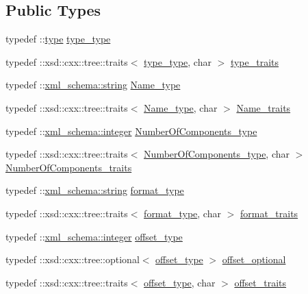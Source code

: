 \subsection*{Public Types}
\begin{DoxyCompactItemize}
\item 
typedef \+::\hyperlink{classtype}{type} \hyperlink{classDataArray__t_a484a0509e4f141d9970d75881703a51e}{type\+\_\+type}
\item 
typedef \+::xsd\+::cxx\+::tree\+::traits$<$ \hyperlink{classDataArray__t_a484a0509e4f141d9970d75881703a51e}{type\+\_\+type}, char $>$ \hyperlink{classDataArray__t_af1dc5f097a8645ae42b57eb3a0b10fa2}{type\+\_\+traits}
\item 
typedef \+::\hyperlink{namespacexml__schema_ac0cec83a330f0024e4e318b3deac5104}{xml\+\_\+schema\+::string} \hyperlink{classDataArray__t_afc6836923916c2489f91caea78ec4ad6}{Name\+\_\+type}
\item 
typedef \+::xsd\+::cxx\+::tree\+::traits$<$ \hyperlink{classDataArray__t_afc6836923916c2489f91caea78ec4ad6}{Name\+\_\+type}, char $>$ \hyperlink{classDataArray__t_a46d0b4cf44ee9122e4cbb3bd3abe6663}{Name\+\_\+traits}
\item 
typedef \+::\hyperlink{namespacexml__schema_aaaea7c8ce4dfbe26cc52c91c29c97b7c}{xml\+\_\+schema\+::integer} \hyperlink{classDataArray__t_aac602cec132f6e771f7fa3be1d19c16f}{Number\+Of\+Components\+\_\+type}
\item 
typedef \+::xsd\+::cxx\+::tree\+::traits$<$ \hyperlink{classDataArray__t_aac602cec132f6e771f7fa3be1d19c16f}{Number\+Of\+Components\+\_\+type}, char $>$ \hyperlink{classDataArray__t_a1112148f87db2c0ba05323377d9f0427}{Number\+Of\+Components\+\_\+traits}
\item 
typedef \+::\hyperlink{namespacexml__schema_ac0cec83a330f0024e4e318b3deac5104}{xml\+\_\+schema\+::string} \hyperlink{classDataArray__t_ae453ea653980baef2e3296005d70bfbd}{format\+\_\+type}
\item 
typedef \+::xsd\+::cxx\+::tree\+::traits$<$ \hyperlink{classDataArray__t_ae453ea653980baef2e3296005d70bfbd}{format\+\_\+type}, char $>$ \hyperlink{classDataArray__t_a2a31ef3ce1dfa973843a02e17762e7a3}{format\+\_\+traits}
\item 
typedef \+::\hyperlink{namespacexml__schema_aaaea7c8ce4dfbe26cc52c91c29c97b7c}{xml\+\_\+schema\+::integer} \hyperlink{classDataArray__t_a7b840c5f08bd2c65cd3c5e24ad132cfb}{offset\+\_\+type}
\item 
typedef \+::xsd\+::cxx\+::tree\+::optional$<$ \hyperlink{classDataArray__t_a7b840c5f08bd2c65cd3c5e24ad132cfb}{offset\+\_\+type} $>$ \hyperlink{classDataArray__t_a4bc33060e7c386b658c752347ac5f03e}{offset\+\_\+optional}
\item 
typedef \+::xsd\+::cxx\+::tree\+::traits$<$ \hyperlink{classDataArray__t_a7b840c5f08bd2c65cd3c5e24ad132cfb}{offset\+\_\+type}, char $>$ \hyperlink{classDataArray__t_a2e3e1a5de665fc64a3d86fd94bb1af0f}{offset\+\_\+traits}
\end{DoxyCompactItemize}
